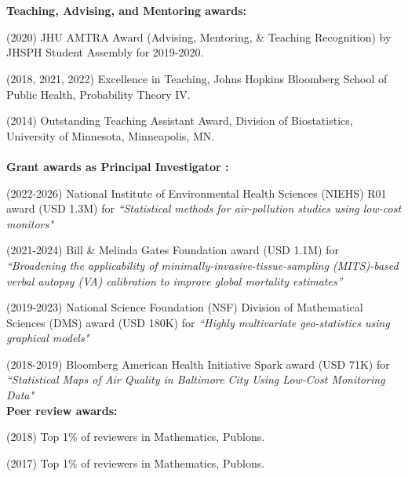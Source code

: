 \documentclass[12pt]{article}
\begin{document}
\\ \\
\noindent \textbf{Teaching, Advising, and Mentoring awards:} 
\item (2020) JHU AMTRA Award (Advising, Mentoring, \& Teaching Recognition) by JHSPH Student Assembly for 2019-2020.
\item (2018, 2021, 2022) Excellence in Teaching, Johns Hopkins Bloomberg School of Public Health, Probability Theory IV.
\item  (2014) Outstanding Teaching Assistant Award, Division of Biostatistics, University of Minnesota, Minneapolis, MN.
\\ \\
\noindent \textbf{Grant awards as Principal Investigator :} 
\item (2022-2026) National Institute of Environmental Health Sciences (NIEHS) R01 award (USD 1.3M) for {\em ``Statistical methods for air-pollution studies using low-cost monitors"}
\item (2021-2024) Bill \& Melinda Gates Foundation award (USD 1.1M) for {\em ``Broadening the applicability of minimally-invasive-tissue-sampling (MITS)-based verbal autopsy (VA) calibration to improve global mortality estimates''}
\item (2019-2023) National Science Foundation (NSF) Division of Mathematical Sciences (DMS) award (USD 180K) for {\em ``Highly multivariate geo-statistics using graphical models"}
\item (2018-2019) Bloomberg American Health Initiative Spark  award (USD 71K) for {\em``Statistical Maps of Air Quality in Baltimore City Using Low-Cost Monitoring Data"}\\

\vskip 1mm \noindent  \textbf{Peer review awards:} 
\item (2018) Top 1\% of reviewers in Mathematics, Publons.
\item (2017) Top 1\% of reviewers in Mathematics, Publons. \\
\end{document}
